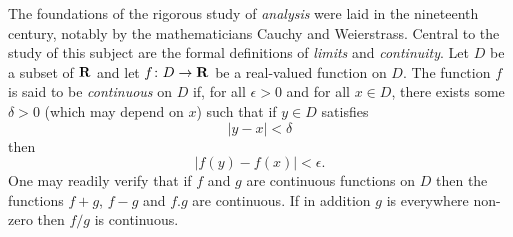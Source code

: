 The foundations of the rigorous study of {\it analysis}
were laid in the nineteenth century, notably by the
mathematicians Cauchy and Weierstrass. Central to the
study of this subject are the formal definitions of
{\it limits} and {\it continuity}.
Let $D$ be a subset of $\bf R$ and let
$f \colon D \to {\bf R}$ be a real-valued function on
$D$. The function $f$ is said to be {\it continuous} on
$D$ if, for all $\epsilon > 0$ and for all $x \in D$,
there exists some $\delta > 0$ (which may depend on $x$)
such that if $y \in D$ satisfies
$$|y - x| < \delta$$
then
$$|f(y) - f(x)| < \epsilon.$$
One may readily verify that if $f$ and $g$ are continuous
functions on $D$ then the functions $f+g$, $f-g$ and
$f.g$ are continuous. If in addition $g$ is everywhere
non-zero then $f/g$ is continuous.
\bye
